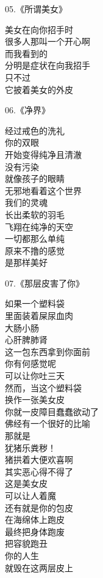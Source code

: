 \documentclass{ctexart}
\begin{document}
\begin{multicols}{2}
    \begin{center}
        05.《所谓美女》\it

        美女在向你招手时 \\ 很多人那叫一个开心啊 \\ 而我看到的 \\ 分明是症状在向我招手 \\ 只不过 \\ 它披着美女的外皮
    \end{center}

    \begin{center}
        06.《净界》\it

        经过戒色的洗礼 \\ 你的双眼 \\ 开始变得纯净且清澈 \\ 没有污染 \\ 就像孩子的眼睛 \\ 无邪地看着这个世界 \\ 我们的灵魂 \\ 长出柔软的羽毛 \\ 飞翔在纯净的天空 \\ 一切都那么单纯 \\ 原来不撸的感觉 \\ 是那样美好
    \end{center}

    \begin{center}
        07.《那层皮害了你》\it

        如果一个塑料袋 \\ 里面装着屎尿血肉 \\ 大肠小肠 \\ 心肝脾肺肾 \\ 这一包东西拿到你面前 \\ 你有何感觉呢 \\ 可以让你吐三天 \\ 然而，当这个塑料袋 \\ 换作一张美女皮 \\ 你就一皮障目蠢蠢欲动了 \\ 佛经有一个很好的比喻 \\ 那就是 \\ 犹猪乐粪秽！ \\ 猪拱着大便欢喜啊 \\ 其实恶心得不得了 \\ 这是美女皮 \\ 可以让人着魔 \\ 还有就是你的包皮 \\ 在海绵体上跑皮 \\ 最终把身体跑废 \\ 把容貌跑丑 \\ 你的人生 \\ 就毁在这两层皮上
    \end{center}


\end{multicols}
\end{document}
